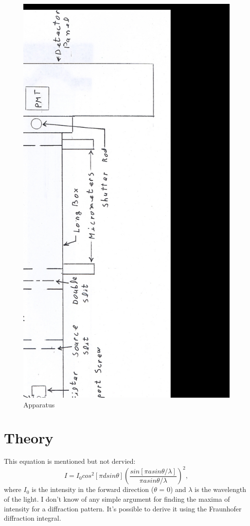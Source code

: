 \documentclass[12pt]{article}
\begin{document}
\begin{figure}[H]
\centering
\hspace{-0.0in}\includegraphics[scale=0.40]{apparatus.png}
\caption{Apparatus \label{fig:setup}}
\end{figure}

\section{Theory}
\indent \indent This equation is mentioned but not dervied:
\[ I = I_0 cos^2[\pi d sin \theta](\frac{sin[\pi a sin\theta / \lambda]}{\pi a sin\theta / \lambda})^2 , \]
\indent \indent where $I_0$ is the intensity in the forward direction ($\theta$ = 0) and $\lambda$ is the wavelength of the light. I don't know of any simple argument for finding the maxima of intensity for a diffraction pattern. It's possible to derive it using the Fraunhofer diffraction integral.
\end{document}
